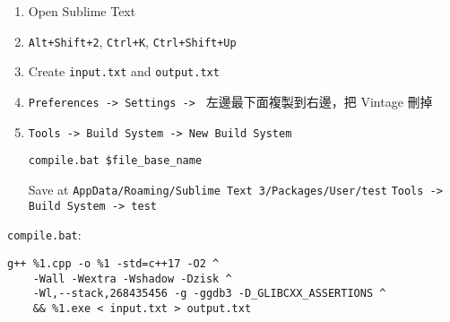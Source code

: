 \begin{enumerate}
    \item Open Sublime Text
    \item \texttt{Alt+Shift+2}, \texttt{Ctrl+K}, \texttt{Ctrl+Shift+Up}
    \item Create \texttt{input.txt} and \texttt{output.txt}
    \item \texttt{Preferences -> Settings -> } 左邊最下面複製到右邊，把 Vintage 刪掉
    \item \texttt{Tools -> Build System -> New Build System}
\begin{lstlisting}
compile.bat $file_base_name
\end{lstlisting}
    Save at \texttt{AppData/Roaming/Sublime Text 3/Packages/User/test}
    \texttt{Tools -> Build System -> test}
\end{enumerate}

\texttt{compile.bat}:
\begin{lstlisting}
g++ %1.cpp -o %1 -std=c++17 -O2 ^
    -Wall -Wextra -Wshadow -Dzisk ^
    -Wl,--stack,268435456 -g -ggdb3 -D_GLIBCXX_ASSERTIONS ^
    && %1.exe < input.txt > output.txt
\end{lstlisting}

